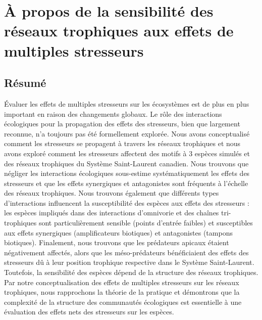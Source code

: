 \chapter{À propos de la sensibilité des réseaux trophiques aux effets de multiples stresseurs}
\label{chap1}

\section{Résumé}

Évaluer les effets de multiples stresseurs sur les écosystèmes est de plus en plus important en raison des changements globaux. Le rôle des interactions écologiques pour la propagation des effets des stresseurs, bien que largement reconnue, n’a toujours pas été formellement explorée. Nous avons conceptualisé comment les stresseurs se propagent à travers les réseaux trophiques et nous avons exploré comment les stresseurs affectent des motifs à 3 espèces simulés et des réseaux trophiques du Système Saint-Laurent canadien. Nous trouvons que négliger les interactions écologiques sous-estime systématiquement les effets des stresseurs et que les effets synergiques et antagonistes sont fréquents à l’échelle des réseaux trophiques. Nous trouvons également que différents types d’interactions influencent la susceptibilité des espèces aux effets des stresseurs : les espèces impliqués dans des interactions d’omnivorie et des chaînes tri-trophiques sont particulièrement sensible (points d’entrée faibles) et susceptibles aux effets synergiques (amplificateurs biotiques) et antagonistes (tampons biotiques). Finalement, nous trouvons que les prédateurs apicaux étaient négativement affectés, alors que les méso-prédateurs bénéficiaient des effets des stresseurs dû à leur position trophique respective dans le Système Saint-Laurent. Toutefois, la sensibilité des espèces dépend de la structure des réseaux trophiques. Par notre conceptualisation des effets de multiples stresseurs sur les réseaux trophiques, nous rapprochons la théorie de la pratique et démontrons que la complexité de la structure des communautés écologiques est essentielle à une évaluation des effets nets des stresseurs sur les espèces.

